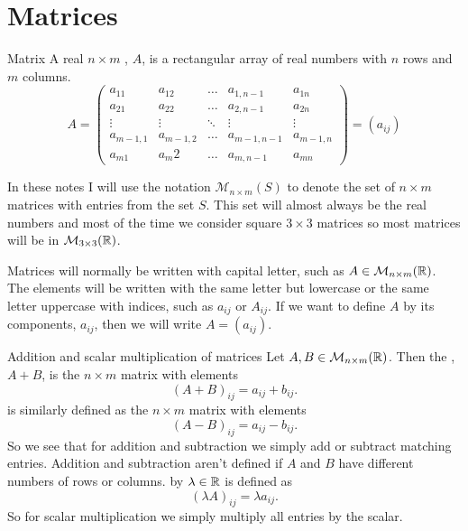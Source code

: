 \documentclass[a4paper]{article}
\newcommand{\nxmMatrices}[3]{\mathcal{M}_{{#1}\times{#2}}({#3})}
\begin{document}
    \section{Matrices}
    \begin{definition}{Matrix}{}
        A real \(n\times m\) , \(A\), is a rectangular array of real numbers with \(n\) rows and \(m\) columns.
        \[
            A = 
            \begin{pmatrix}
                a_{11}     & a_{12}     & \dots  & a_{1, n-1}    & a_{1n} \\
                a_{21}     & a_{22}     & \dots  & a_{2, n-1}    & a_{2n} \\
                \vdots     & \vdots     & \ddots & \vdots & \vdots \\
                a_{m-1, 1} & a_{m-1, 2} & \dots  &  a_{m-1, n-1} & a_{m-1, n}\\
                a_{m1}     & a_m{2}     & \dots  &  a_{m, n-1}    & a_{mn}
            \end{pmatrix}
            = (a_{ij})
        \]
    \end{definition}
    \begin{notation*}{}
        In these notes I will use the notation \(\nxmMatrices{n}{m}{S}\) to denote the set of \(n\times m\) matrices with entries from the set \(S\).
        This set will almost always be the real numbers and most of the time we consider square \(3\times 3\) matrices so most matrices will be in \(\nxmMatrices{3}{3}{\reals}\).
    \end{notation*}
    \begin{notation*}{}
        Matrices will normally be written with capital letter, such as \(A\in\nxmMatrices{n}{m}{\reals}\).
        The elements will be written with the same letter but lowercase or the same letter uppercase with indices, such as \(a_{ij}\) or \(A_{ij}\).
        If we want to define \(A\) by its components, \(a_{ij}\), then we will write \(A = (a_{ij})\).
    \end{notation*}
    \begin{definition}{Addition and scalar multiplication of matrices}{}
        Let \(A, B \in \nxmMatrices{n}{m}{\reals}\).
        Then the , \(A + B\), is the \(n\times m\) matrix with elements
        \[(A + B)_{ij} = a_{ij} + b_{ij}.\]
         is similarly defined as the \(n\times m\) matrix with elements
        \[(A - B)_{ij} = a_{ij} - b_{ij}.\]
        So we see that for addition and subtraction we simply add or subtract matching entries.
        Addition and subtraction aren't defined if \(A\) and \(B\) have different numbers of rows or columns.
         by \(\lambda\in\mathbb{R}\) is defined as
        \[(\lambda A)_{ij} = \lambda a_{ij}.\]
        So for scalar multiplication we simply multiply all entries by the scalar.
    \end{definition}
\end{document}
